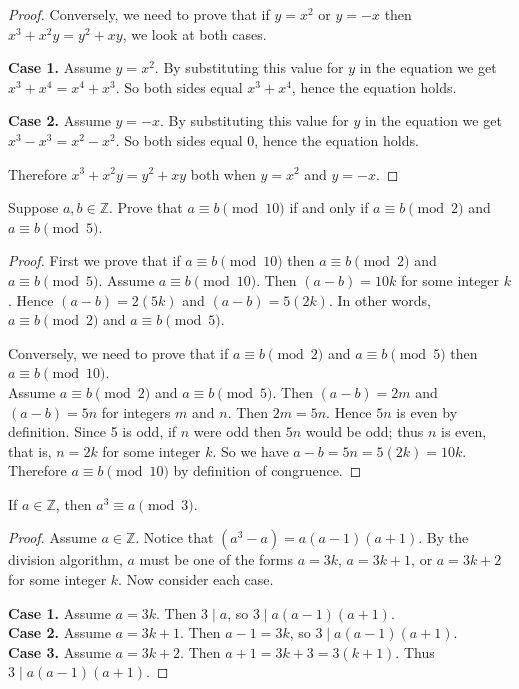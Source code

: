 \documentclass[DIN, pagenumber=false, fontsize=11pt, parskip=half]{scrartcl}
\begin{document}
\begin{problems}
\begin{proof}
        Conversely, we need to prove that if $y = x^2$ or $y = -x$ then $x^3+x^2y=y^2+xy$, we look at both cases.

        \textbf{Case 1.} Assume $y = x^2$.
        By substituting this value for $y$ in the equation we get $x^3+x^4=x^4+x^3$.
        So both sides equal $x^3+x^4$, hence the equation holds.

        \textbf{Case 2.} Assume $y = -x$.
        By substituting this value for $y$ in the equation we get $x^3-x^3=x^2-x^2$.
        So both sides equal 0, hence the equation holds.

        Therefore $x^3+x^2y=y^2+xy$ both when $y = x^2$ and $y = -x$.
    \end{proof}

    \problem Suppose $a,b \in \mathbb{Z}$. Prove that $a \equiv b \pmod{10}$ if and only if $a \equiv b \pmod{2}$ and $a \equiv b \pmod{5}$.
    \begin{proof}
        First we prove that if $a \equiv b \pmod{10}$ then $a \equiv b \pmod{2}$ and $a \equiv b \pmod{5}$.
        Assume $a \equiv b \pmod{10}$.
        Then $(a-b) = 10k$ for some integer $k$.
        Hence $(a-b) = 2(5k)$ and $(a-b) = 5(2k)$.
        In other words, $a \equiv b \pmod{2}$ and $a \equiv b \pmod{5}$.

        Conversely, we need to prove that if $a \equiv b \pmod{2}$ and $a \equiv b \pmod{5}$ then $a \equiv b \pmod{10}$.\\
        Assume $a \equiv b \pmod{2}$ and $a \equiv b \pmod{5}$.
        Then $(a-b) = 2m$ and $(a-b) = 5n$ for integers $m$ and $n$.
        Then $2m = 5n$. Hence $5n$ is even by definition.
        Since 5 is odd, if $n$ were odd then $5n$ would be odd; thus $n$ is even, that is, $n = 2k$ for some integer $k$.
        So we have $a - b = 5n = 5(2k) = 10k$.
        Therefore $a \equiv b \pmod{10}$ by definition of congruence.
    \end{proof}

    \problem If $a \in \mathbb{Z}$, then $a^3 \equiv a \pmod{3}$.
    \begin{proof}
        Assume $a \in \mathbb{Z}$.
        Notice that $(a^3 - a) = a(a-1)(a+1)$.
        By the division algorithm, $a$ must be one of the forms
        $a = 3k$, $a = 3k+1$, or $a = 3k+2$ for some integer $k$.
        Now consider each case.

        \textbf{Case 1.} Assume $a = 3k$. Then $3 \mid a$, so $3 \mid a(a-1)(a+1)$.\\ 
        \textbf{Case 2.} Assume $a = 3k+1$. Then $a - 1 = 3k$, so $3 \mid a(a-1)(a+1)$.\\ 
        \textbf{Case 3.} Assume $a = 3k+2$. Then $a + 1 = 3k+3 = 3(k+1)$. Thus $3 \mid a(a-1)(a+1)$.


\end{proof}
\end{problems}
\end{document}
